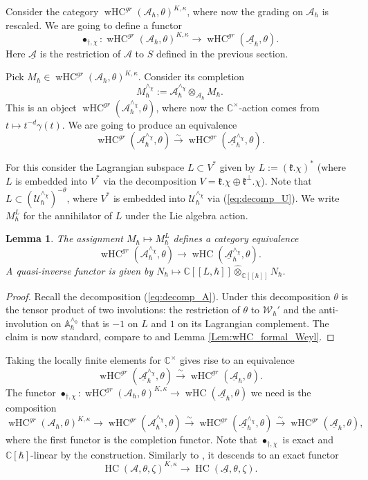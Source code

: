 \documentclass[12pt]{amsart}
\newcommand{\C}{\mathbb{C}}
\newcommand{\A}{\mathcal{A}}
\newcommand{\U}{\mathcal{U}}
\newcommand{\Walg}{\mathcal{W}}
\newcommand{\kf}{\mathfrak{k}}
\newcommand{\HC}{\operatorname{HC}}
\newcommand{\wHC}{\operatorname{wHC}}
\newcommand{\Weyl}{\mathbb{A}}
\newtheorem{Lem}[Thm]{Lemma}
\theoremstyle{definition}
\numberwithin{equation}{section}
\begin{document}
Consider the category
$\wHC^{gr}(\A_\hbar,\theta)^{K,\kappa}$, where now the grading on $\A_\hbar$ is rescaled.
 We are going to define a functor
$$\bullet_{\dagger,\chi}: \wHC^{gr}(\A_\hbar,\theta)^{K,\kappa}\rightarrow \wHC^{gr}(\underline{\A}_\hbar,
\theta).$$
Here
$\underline{\A}$ is the restriction of $\A$ to $S$ defined in the previous section.

Pick $M_\hbar\in \wHC^{gr}(\A_\hbar,\theta)^{K,\kappa}$.
Consider its completion
$$M_\hbar^{\wedge_\chi}:=\A_\hbar^{\wedge_\chi}\otimes_{\A_\hbar}M_\hbar.$$
This is an object $\wHC^{gr}(\A_\hbar^{\wedge_\chi},\theta)$, where now the $\C^\times$-action
comes from $t\mapsto t^{-d}\gamma(t)$.
We are going to produce an equivalence $$\wHC^{gr}(\A_\hbar^{\wedge_\chi},\theta)
\xrightarrow{\sim} \wHC^{gr}(\underline{\A}_\hbar^{\wedge_\chi},\theta).$$

For this consider the Lagrangian subspace $L\subset V^*$ given by $L:=(\kf.\chi)^*$
(where $L$ is embedded into $V^*$ via the decomposition $V=\kf.\chi\oplus \kf^\perp.\chi$).
Note that $L\subset \left(\U_{\hbar}^{\wedge_\chi}\right)^{-\theta}$, where $V^*$
is embedded into $\U_{\hbar}^{\wedge_\chi}$ via (\ref{eq:decomp_U}).
We write $M_\hbar^L$ for the annihilator of $L$ under the Lie algebra action.

\begin{Lem}\label{Lem:wHC_equivalence}
The assignment $M_\hbar\mapsto M_\hbar^L$ defines a category equivalence
$$\wHC^{gr}(\A_\hbar^{\wedge_\chi},\theta)
\rightarrow \wHC(\underline{\A}_\hbar^{\wedge_\chi},\theta).$$
A quasi-inverse functor is given by $N_\hbar\mapsto \C[[L,\hbar]]\widehat{\otimes}_{\C[[\hbar]]} N_\hbar$.
\end{Lem}
\begin{proof}
Recall the decomposition (\ref{eq:decomp_A}). Under this decomposition $\theta$ is the tensor product
of two involutions: the restriction of $\theta$ to $\Walg_\hbar'$ and the anti-involution on
$\Weyl_\hbar^{\wedge_0}$ that is $-1$ on $L$ and $1$ on its Lagrangian complement.
The claim is now standard, compare to \cite[Proposition 3.3.1]{HC} and Lemma \ref{Lem:wHC_formal_Weyl}.
\end{proof}

Taking the locally finite elements for $\C^\times$ gives rise to an equivalence
$$\wHC^{gr}(\underline{\A}_\hbar^{\wedge_\chi},\theta)\xrightarrow{\sim} \wHC^{gr}(\underline{\A}_\hbar,\theta).$$
The functor $\bullet_{\dagger,\chi}:\wHC^{gr}(\A_\hbar,\theta)^{K,\kappa}\rightarrow \wHC(\underline{\A}_\hbar,\theta)$ we need
is the composition
$$\wHC^{gr}(\A_\hbar,\theta)^{K,\kappa}\rightarrow \wHC^{gr}(\A_\hbar^{\wedge_\chi},\theta)\xrightarrow{\sim}
\wHC^{gr}(\underline{\A}^{\wedge_\chi}_\hbar,\theta)\xrightarrow{\sim} \wHC^{gr}(\underline{\A}_\hbar,\theta),$$
where the first functor is the completion functor. Note that $\bullet_{\dagger,\chi}$
is exact and  $\C[\hbar]$-linear by the construction. Similarly to
\cite[Section 3.4]{HC}, it descends to an exact functor
$$\HC(\A,\theta,\zeta)^{K,\kappa}\rightarrow \HC(\underline{\A},\theta,\zeta).$$
\end{document}
